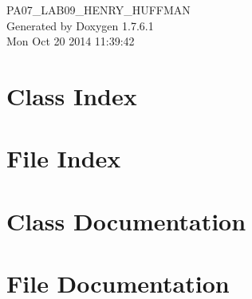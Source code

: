 \documentclass[a4paper]{book}
\begin{document}
\hypersetup{pageanchor=false,citecolor=blue}
\begin{titlepage}
\vspace*{7cm}
\begin{center}
{\Large \-P\-A07\-\_\-\-L\-A\-B09\-\_\-\-H\-E\-N\-R\-Y\-\_\-\-H\-U\-F\-F\-M\-A\-N }\\
\vspace*{1cm}
{\large \-Generated by Doxygen 1.7.6.1}\\
\vspace*{0.5cm}
{\small Mon Oct 20 2014 11:39:42}\\
\end{center}
\end{titlepage}
\clearemptydoublepage
{}
\tableofcontents
\clearemptydoublepage
{}
\hypersetup{pageanchor=true,citecolor=blue}
\chapter{\-Class \-Index}

\chapter{\-File \-Index}

\chapter{\-Class \-Documentation}





\chapter{\-File \-Documentation}







\printindex
\end{document}
